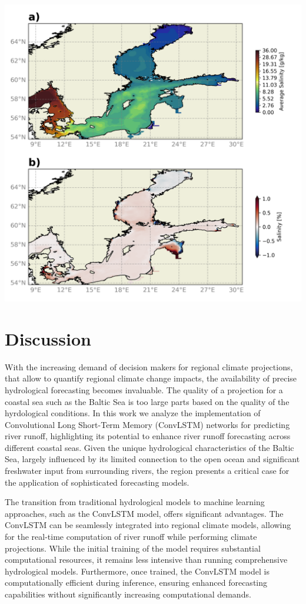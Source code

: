 \documentclass[
]{agujournal2019}
\begin{document}
\includegraphics{../src/figures/evaluation_MOM.png}

\hypertarget{discussion}{%
\section{Discussion}\label{discussion}}

With the increasing demand of decision makers for regional climate
projections, that allow to quantify regional climate change impacts, the
availability of precise hydrological forecasting becomes invaluable. The
quality of a projection for a coastal sea such as the Baltic Sea is too
large parts based on the quality of the hyrdological conditions. In this
work we analyze the implementation of Convolutional Long Short-Term
Memory (ConvLSTM) networks for predicting river runoff, highlighting its
potential to enhance river runoff forecasting across different coastal
seas. Given the unique hydrological characteristics of the Baltic Sea,
largely influenced by its limited connection to the open ocean and
significant freshwater input from surrounding rivers, the region
presents a critical case for the application of sophisticated
forecasting models.

The transition from traditional hydrological models to machine learning
approaches, such as the ConvLSTM model, offers significant advantages.
The ConvLSTM can be seamlessly integrated into regional climate models,
allowing for the real-time computation of river runoff while performing
climate projections. While the initial training of the model requires
substantial computational resources, it remains less intensive than
running comprehensive hydrological models. Furthermore, once trained,
the ConvLSTM model is computationally efficient during inference,
ensuring enhanced forecasting capabilities without significantly
increasing computational demands.
\end{document}
